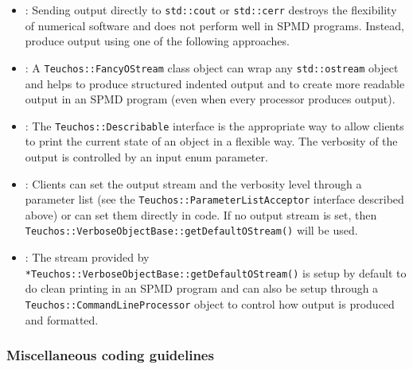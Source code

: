 \begin{itemize}

{}\item\GCGStdStream: Sending output directly to {}\texttt{std\-::cout} or
{}\texttt{std\-::cerr} destroys the flexibility of numerical software and does
not perform well in SPMD programs.  Instead, produce output using one of the
following approaches.

{}\item\GCGTeuchosFancyOStream: A {}\texttt{Teuchos\-::Fancy\-OStream} class object
can wrap any {}\texttt{std\-::ostream} object and helps to produce structured
indented output and to create more readable output in an SPMD program (even
when every processor produces output).

{}\item\GCGTeuchosDescribable: The {}\texttt{Teuchos\-::Describable} interface is
the appropriate way to allow clients to print the current state of an object
in a flexible way.  The verbosity of the output is controlled by an input enum
parameter.

{}\item\GCGTeuchosVerboseObject: Clients can set the output stream and the
verbosity level through a parameter list (see the
{}\texttt{Teuchos\-::ParameterListAcceptor} interface described above) or can
set them directly in code.  If no output stream is set, then
{}\texttt{Teuchos\-::Verbose\-Object\-Base\-::get\-Default\-OStream()} will be
used.

{}\item\GCGTeuchosVerboseObjectBaseDefaultOStream: The stream provided by
{}\texttt{*Teuchos\-::Verbose\-Object\-Base\-::get\-Default\-OStream()} is
setup by default to do clean printing in an SPMD program and can also be setup
through a {}\texttt{Teuchos\-::Command\-Line\-Processor} object to control how
output is produced and formatted.

\end{itemize}

%
\subsubsection{Miscellaneous coding guidelines}
%

